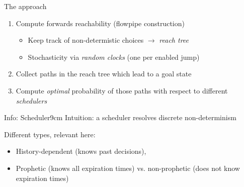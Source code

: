 \documentclass[aspectratio=169]{beamer}
\begin{document}
\begin{frame}{The approach}

  \begin{enumerate}
    \item Compute forwards reachability (flowpipe construction)
    \begin{itemize}
      \item Keep track of non-determistic choices $\rightarrow$ \emph{reach tree}
      \item Stochasticity via \emph{random clocks} (one per enabled jump)
    \end{itemize}
    \item Collect paths in the reach tree which lead to a goal state
    \item Compute \emph{optimal} probability of those paths with respect to different \emph{schedulers}
  \end{enumerate}

  \bigskip

  \centering
  \begin{reminder}{\footnotesize Info: Scheduler}{9cm}
    \footnotesize
    Intuition: a scheduler resolves discrete non-determinism

    Different types, relevant here:
    \begin{itemize}
      \item History-dependent (knows past decisions),
      \item Prophetic (knows all expiration times) vs. non-prophetic (does not know expiration times)
    \end{itemize}
  \end{reminder}
\end{frame}

\end{document}
